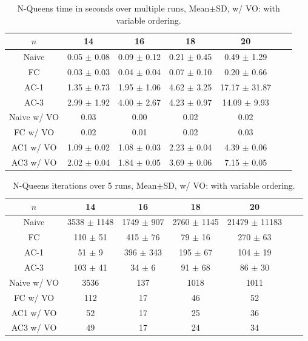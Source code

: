 \begin{table}[h!]
	\centering
	\begin{tabular}{|c|c|c|c|c|c|c|}
		\hline
		$n$         & 14              & 16              & 18              & 20                \\ \hline
		Naive       & 0.05 $\pm$ 0.08 & 0.09 $\pm$ 0.12 & 0.21 $\pm$ 0.45 & 0.49 $\pm$ 1.29   \\ \hline
		FC          & 0.03 $\pm$ 0.03 & 0.04 $\pm$ 0.04 & 0.07 $\pm$ 0.10 & 0.20 $\pm$ 0.66   \\ \hline
		AC-1        & 1.35 $\pm$ 0.73 & 1.95 $\pm$ 1.06 & 4.62 $\pm$ 3.25 & 17.17 $\pm$ 31.87 \\ \hline
		AC-3        & 2.99 $\pm$ 1.92 & 4.00 $\pm$ 2.67 & 4.23 $\pm$ 0.97 & 14.09 $\pm$ 9.93  \\ \hline
		Naive w/ VO & 0.03            & 0.00            & 0.02            & 0.02              \\ \hline
		FC w/ VO    & 0.02            & 0.01            & 0.02            & 0.03              \\ \hline
		AC1 w/ VO   & 1.09 $\pm$ 0.02 & 1.08 $\pm$ 0.03 & 2.23 $\pm$ 0.04 & 4.39 $\pm$ 0.06   \\ \hline
		AC3 w/ VO   & 2.02 $\pm$ 0.04 & 1.84 $\pm$ 0.05 & 3.69 $\pm$ 0.06 & 7.15 $\pm$ 0.05   \\ \hline
	\end{tabular}
	\caption{N-Queens time in seconds over multiple runs, Mean$\pm$SD, w/ VO: with variable ordering.}
	\label{tab:queens:time}
\end{table}

\begin{table}[h!]
	\centering
	\begin{tabular}{|c|c|c|c|c|c|c|}
		\hline
		$n$         & 14              & 16             & 18              & 20                \\ \hline
		Naive       & 3538 $\pm$ 1148 & 1749 $\pm$ 907 & 2760 $\pm$ 1145 & 21479 $\pm$ 11183 \\ \hline
		FC          & 110 $\pm$ 51    & 415 $\pm$ 76   & 79 $\pm$ 16     & 270 $\pm$ 63      \\ \hline
		AC-1        & 51 $\pm$ 9      & 396 $\pm$ 343  & 195 $\pm$ 67    & 104 $\pm$ 19      \\ \hline
		AC-3        & 103 $\pm$ 41    & 34 $\pm$ 6     & 91 $\pm$ 68     & 86 $\pm$ 30       \\ \hline
		Naive w/ VO & 3536            & 137            & 1018            & 1011              \\ \hline
		FC w/ VO    & 112             & 17             & 46              & 52                \\ \hline
		AC1 w/ VO   & 52              & 17             & 25              & 36                \\ \hline
		AC3 w/ VO   & 49              & 17             & 24              & 34                \\ \hline
	\end{tabular}
	\caption{N-Queens iterations over 5 runs, Mean$\pm$SD, w/ VO: with variable ordering.}
	\label{tab:queens:iterations}
\end{table}

